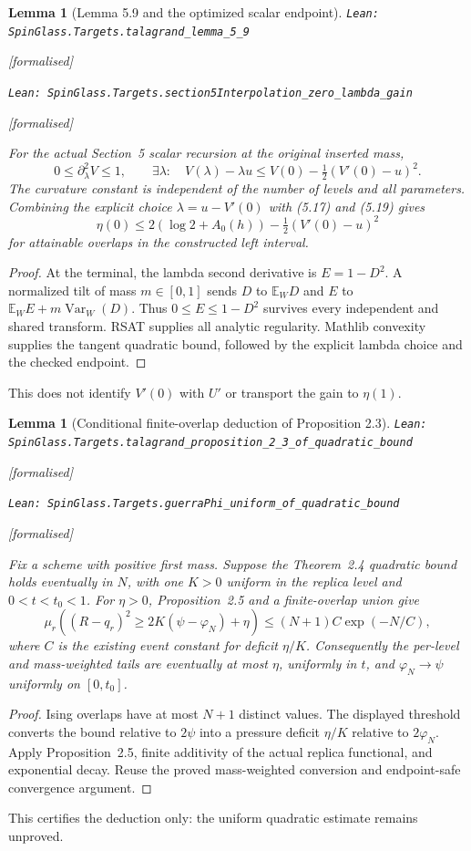 \documentclass[11pt]{article}
\providecommand{\lean}[1]{\leavevmode\par\nopagebreak
  {\noindent\normalfont\footnotesize\raggedright\texttt{Lean: #1}\par}\nopagebreak}
\providecommand{\leanok}{\par\nopagebreak
  {\noindent\normalfont\footnotesize\textcolor{green!50!black}{[formalised]}\par}\nopagebreak}
\newtheorem{lemma}[theorem]{Lemma}
\begin{document}
\begin{lemma}[Lemma 5.9 and the optimized scalar endpoint]
\lean{SpinGlass.Targets.talagrand\_lemma\_5\_9}\leanok
\lean{SpinGlass.Targets.section5Interpolation\_zero\_lambda\_gain}\leanok
For the actual Section~5 scalar recursion at the original inserted mass,
\[
 0\le \partial_\lambda^2 V\le1,
 \qquad
 \exists\lambda:\quad V(\lambda)-\lambda u
 \le V(0)-\tfrac12(V'(0)-u)^2.
\]
The curvature constant is independent of the number of levels and all parameters.
Combining the explicit choice $\lambda=u-V'(0)$ with (5.17) and (5.19) gives
\[
 \eta(0)\le2(\log2+A_0(h))-\tfrac12(V'(0)-u)^2
\]
for attainable overlaps in the constructed left interval.
\end{lemma}
\begin{proof}
At the terminal, the lambda second derivative is $E=1-D^2$.
A normalized tilt of mass $m\in[0,1]$ sends $D$ to $\mathbb E_WD$ and
$E$ to $\mathbb E_WE+m\operatorname{Var}_W(D)$. Thus
$0\le E\le1-D^2$ survives every independent and shared transform.
RSAT supplies all analytic regularity. Mathlib convexity supplies the tangent
quadratic bound, followed by the explicit lambda choice and the checked endpoint.
\end{proof}
This does not identify $V'(0)$ with $U'$ or transport the gain to $\eta(1)$.

\begin{lemma}[Conditional finite-overlap deduction of Proposition 2.3]
\lean{SpinGlass.Targets.talagrand\_proposition\_2\_3\_of\_quadratic\_bound}\leanok
\lean{SpinGlass.Targets.guerraPhi\_uniform\_of\_quadratic\_bound}\leanok
Fix a scheme with positive first mass. Suppose the Theorem~2.4 quadratic
bound holds eventually in $N$, with one $K>0$ uniform in the replica level
and $0<t<t_0<1$. For $\eta>0$, Proposition~2.5 and a finite-overlap union give
\[
 \mu_r\!\left((R-q_r)^2\ge2K(\psi-\varphi_N)+\eta\right)
 \le (N+1)C\exp(-N/C),
\]
where $C$ is the existing event constant for deficit $\eta/K$.
Consequently the per-level and mass-weighted tails are eventually at most
$\eta$, uniformly in $t$, and $\varphi_N\to\psi$ uniformly on $[0,t_0]$.
\end{lemma}
\begin{proof}
Ising overlaps have at most $N+1$ distinct values. The displayed threshold
converts the bound relative to $2\psi$ into a pressure deficit $\eta/K$
relative to $2\varphi_N$. Apply Proposition~2.5, finite additivity of the
actual replica functional, and exponential decay. Reuse the proved
mass-weighted conversion and endpoint-safe convergence argument.
\end{proof}
This certifies the deduction only: the uniform quadratic estimate remains unproved.
\end{document}
